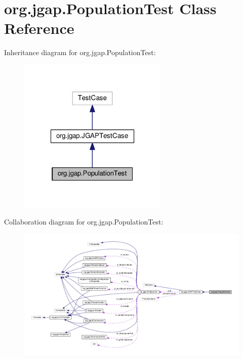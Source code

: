 \hypertarget{classorg_1_1jgap_1_1_population_test}{\section{org.\-jgap.\-Population\-Test Class Reference}
\label{classorg_1_1jgap_1_1_population_test}
}


Inheritance diagram for org.\-jgap.\-Population\-Test\-:
\nopagebreak
\begin{figure}[H]
\begin{center}
\leavevmode
\includegraphics[width=202pt]{classorg_1_1jgap_1_1_population_test__inherit__graph}
\end{center}
\end{figure}


Collaboration diagram for org.\-jgap.\-Population\-Test\-:
\nopagebreak
\begin{figure}[H]
\begin{center}
\leavevmode
\includegraphics[width=350pt]{classorg_1_1jgap_1_1_population_test__coll__graph}
\end{center}
\end{figure}
